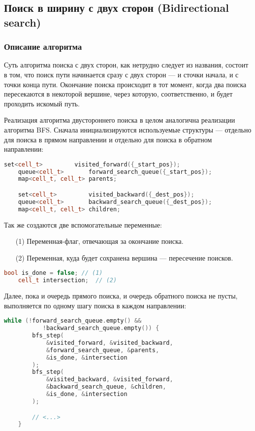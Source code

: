 \documentclass[a4paper, 12pt]{article}
\begin{document}
\subsection{Поиск в ширину с двух сторон (Bidirectional search)}
\subsubsection{Описание алгоритма}
\label{ssub:bi_BFS_algorithm}
Суть алгоритма поиска с двух сторон, как нетрудно следует из названия, состоит в том, что поиск пути начинается сразу с двух сторон --- и сточки начала, и с точки конца пути. Окончание поиска происходит в тот момент, когда два поиска пересекаются в некоторой вершине, через которую, соответственно, и будет проходить искомый путь.

Реализация алгоритма двустороннего поиска в целом аналогична реализации алгоритма BFS. Сначала инициализируются используемые структуры --- отдельно для поиска в прямом направлении и отдельно для поиска в обратном направлении:

\begin{lstlisting}[language=C++]
    set<cell_t>         visited_forward({_start_pos});
    queue<cell_t>       forward_search_queue({_start_pos});
    map<cell_t, cell_t> parents;

    set<cell_t>         visited_backward({_dest_pos});
    queue<cell_t>       backward_search_queue({_dest_pos});
    map<cell_t, cell_t> children;
\end{lstlisting}

Так же создаются две вспомогательные переменные:
\begin{itemize}
    \item[(1)] Переменная-флаг, отвечающая за окончание поиска.
    \item[(2)] Переменная, куда будет сохранена вершина --- пересечение поисков.
\end{itemize}
\begin{lstlisting}[language=C++]
    bool is_done = false; // (1)
    cell_t intersection;  // (2)
\end{lstlisting}

Далее, пока и очередь прямого поиска, и очередь обратного поиска не пусты, выполняется по одному шагу поиска в каждом направлении:
\begin{lstlisting}[language=C++]
    while (!forward_search_queue.empty() &&
           !backward_search_queue.empty()) {
        bfs_step(
            &visited_forward, &visited_backward,
            &forward_search_queue, &parents,
            &is_done, &intersection
        );
        bfs_step(
            &visited_backward, &visited_forward,
            &backward_search_queue, &children,
            &is_done, &intersection
        );

        // <...>
    }
\end{lstlisting}
\end{document}
